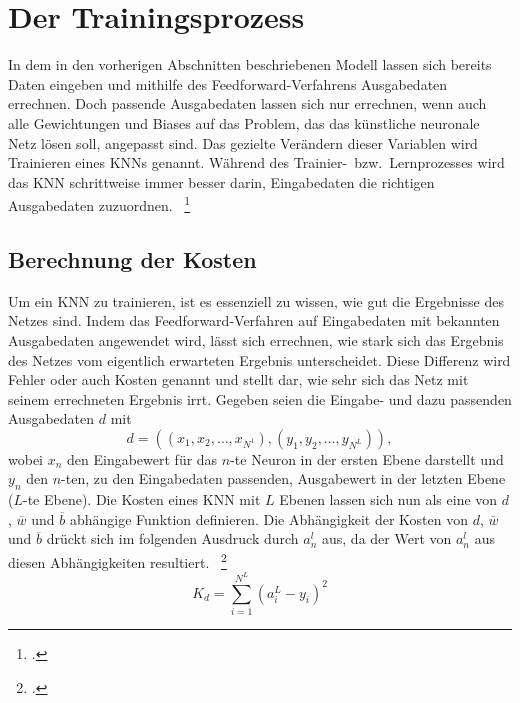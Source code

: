 \section{Der Trainingsprozess}\label{sec:training}
In dem in den vorherigen Abschnitten beschriebenen Modell lassen sich bereits Daten eingeben und mithilfe des Feedforward-Verfahrens Ausgabedaten errechnen.
Doch passende Ausgabedaten lassen sich nur errechnen, wenn auch alle Gewichtungen und Biases auf das Problem, das das künstliche neuronale Netz lösen soll, angepasst sind.
Das gezielte Verändern dieser Variablen wird Trainieren eines KNNs genannt.
Während des Trainier-~bzw.~Lernprozesses wird das KNN schrittweise immer besser darin, Eingabedaten die richtigen Ausgabedaten zuzuordnen.
~\footcite{3b1b-2}

\subsection{Berechnung der Kosten}\label{subsec:kosten}
Um ein KNN zu trainieren, ist es essenziell zu wissen, wie gut die Ergebnisse des Netzes sind.
Indem das Feedforward-Verfahren auf Eingabedaten mit bekannten Ausgabedaten angewendet wird, lässt sich errechnen, wie stark sich das Ergebnis des Netzes vom eigentlich erwarteten Ergebnis unterscheidet.
Diese Differenz wird Fehler oder auch Kosten genannt und stellt dar, wie sehr sich das Netz mit seinem errechneten Ergebnis irrt.
Gegeben seien die Eingabe- und dazu passenden Ausgabedaten $d$ mit \[d = ((x_1, x_2, \dots, x_{N^1}), (y_1, y_2, \dots, y_{N^L})),\] wobei $x_n$ den Eingabewert für das $n$-te Neuron in der ersten Ebene darstellt und $y_n$ den $n$-ten, zu den Eingabedaten passenden, Ausgabewert in der letzten Ebene ($L$-te Ebene).
Die Kosten eines KNN mit $L$ Ebenen lassen sich nun als eine von $d$, $\overline{w}$ und $\overline{b}$ abhängige Funktion definieren.
Die Abhängigkeit der Kosten von $d$, $\overline{w}$ und $\overline{b}$ drückt sich im folgenden Ausdruck durch $a^l_n$ aus, da der Wert von $a^l_n$ aus diesen Abhängigkeiten resultiert.
~\footcite{3b1b-2}
\begin{equation}
    K_d = \sum\limits^{N^L}_{i=1}(a^L_i - y_i)^2
    \label{eq:kosten}
\end{equation}

